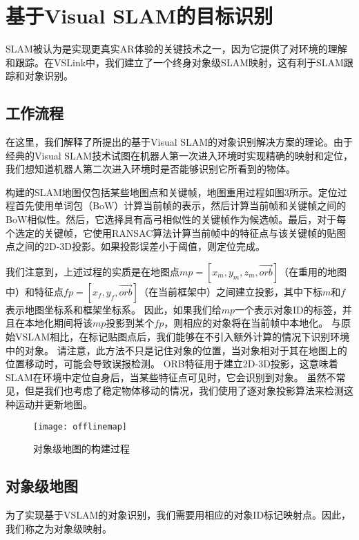 \section{基于Visual SLAM的目标识别}\label{subsec:vslam}
SLAM被认为是实现更真实AR体验的关键技术之一，因为它提供了对环境的理解和跟踪。在VSLink中，我们建立了一个终身对象级SLAM映射，这有利于SLAM跟踪和对象识别。

\subsection{工作流程}
在这里，我们解释了所提出的基于Visual SLAM的对象识别解决方案的理论。由于经典的Visual SLAM\cite{mur2017orb,engel2014lsd}技术试图在机器人第一次进入环境时实现精确的映射和定位，我们想知道机器人第二次进入环境时是否能够识别它所看到的物体。

构建的SLAM地图\cite{mur2017orb}仅包括某些地图点和关键帧，地图重用过程如图3所示。定位过程首先使用单词包（BoW）\cite{galvez2012bags}计算当前帧的表示，然后计算当前帧和关键帧之间的BoW相似性。然后，它选择具有高弓相似性的关键帧作为候选帧。最后，对于每个选定的关键帧，它使用RANSAC\cite{derpanis2010overview}算法计算当前帧中的特征点与该关键帧的贴图点之间的2D-3D投影。如果投影误差小于阈值，则定位完成。

我们注意到，上述过程的实质是在地图点$mp = [x_m,y_m,z_m,\vec{orb}]$（在重用的地图中）和特征点$fp = [x_f,y_f,\vec{orb}]$（在当前框架中）之间建立投影，其中下标$m$和$f$表示地图坐标系和框架坐标系。
因此，如果我们给$mp$一个表示对象ID的标签，并且在本地化期间将该$mp$投影到某个$fp$，则相应的对象将在当前帧中本地化。
与原始VSLAM相比，在标记贴图点后，我们能够在不引入额外计算的情况下识别环境中的对象。
请注意，此方法不只是记住对象的位置，当对象相对于其在地图上的位置移动时，可能会导致误报检测。
ORB特征用于建立2D-3D投影，这意味着SLAM在环境中定位自身后，当某些特征点可见时，它会识别到对象。
虽然不常见，但是我们也考虑了稳定物体移动的情况，我们使用了逐对象投影算法来检测这种运动并更新地图。


\begin{figure}[t]
	\centering
	\texttt{[image: offlinemap]}
	\caption{对象级地图的构建过程}
	\label{fig:offlinemap}
\end{figure}

\subsection{对象级地图}\label{subsec:map}
为了实现基于VSLAM的对象识别，我们需要用相应的对象ID标记映射点。因此，我们称之为对象级映射。


